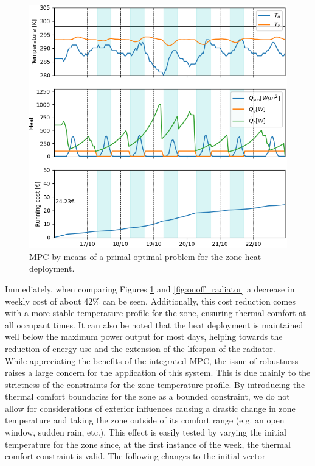 \begin{figure}[H]
\centering
\includegraphics[scale=0.8]{images/mpc_primal.png}
\caption{MPC by means of a primal optimal problem for the zone heat deployment.}
\label{fig:mpc_primal}
\end{figure}

Immediately, when comparing Figures \ref{fig:mpc_primal} and \ref{fig:onoff_radiator} a decrease in weekly cost of about 42\% can be seen. Additionally, this cost reduction comes with a more stable temperature profile for the zone, ensuring thermal comfort at all occupant times. It can also be noted that the heat deployment is maintained well below the maximum power output for most days, helping towards the reduction of energy use and the extension of the lifespan of the radiator.\\

While appreciating the benefits of the integrated MPC, the issue of robustness raises a large concern for the application of this system. This is due mainly to the strictness of the constraints for the zone temperature profile. By introducing the thermal comfort boundaries for the zone as a bounded constraint, we do not allow for considerations of exterior influences causing a drastic change in zone temperature and taking the zone outside of its comfort range (e.g. an open window, sudden rain, etc.). This effect is easily tested by varying the initial temperature for the zone since, at the first instance of the week, the thermal comfort constraint is valid. The following changes to the initial vector

